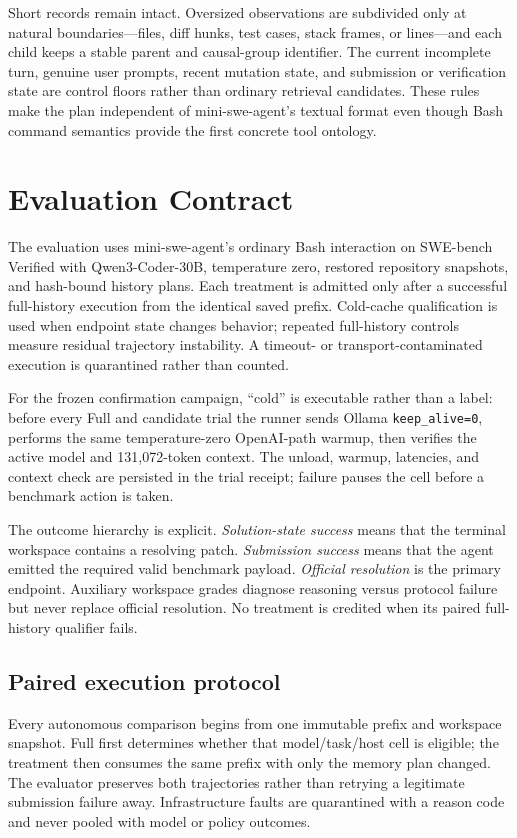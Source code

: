 \documentclass[11pt]{article}
\begin{document}
Short records remain intact.  Oversized observations are subdivided only at
natural boundaries---files, diff hunks, test cases, stack frames, or lines---and
each child keeps a stable parent and causal-group identifier.  The current
incomplete turn, genuine user prompts, recent mutation state, and submission or
verification state are control floors rather than ordinary retrieval
candidates.  These rules make the plan independent of mini-swe-agent's textual
format even though Bash command semantics provide the first concrete tool
ontology.

\section{Evaluation Contract}

The evaluation uses mini-swe-agent's ordinary Bash interaction on SWE-bench
Verified with Qwen3-Coder-30B, temperature zero, restored repository snapshots,
and hash-bound history plans.  Each treatment is admitted only after a successful
full-history execution from the identical saved prefix.  Cold-cache qualification
is used when endpoint state changes behavior; repeated full-history controls
measure residual trajectory instability.  A timeout- or transport-contaminated
execution is quarantined rather than counted.

For the frozen confirmation campaign, ``cold'' is executable rather than a
label: before every Full and candidate trial the runner sends Ollama
\texttt{keep\_alive=0}, performs the same temperature-zero OpenAI-path warmup,
then verifies the active model and 131,072-token context.  The unload, warmup,
latencies, and context check are persisted in the trial receipt; failure pauses
the cell before a benchmark action is taken.

The outcome hierarchy is explicit.  \emph{Solution-state success} means that
the terminal workspace contains a resolving patch.  \emph{Submission success}
means that the agent emitted the required valid benchmark payload.
\emph{Official resolution} is the primary endpoint.  Auxiliary workspace grades
diagnose reasoning versus protocol failure but never replace official resolution.
No treatment is credited when its paired full-history qualifier fails.

\subsection{Paired execution protocol}

Every autonomous comparison begins from one immutable prefix and workspace
snapshot.  Full first determines whether that model/task/host cell is eligible;
the treatment then consumes the same prefix with only the memory plan changed.
The evaluator preserves both trajectories rather than retrying a legitimate
submission failure away.  Infrastructure faults are quarantined with a reason
code and never pooled with model or policy outcomes.
\end{document}
